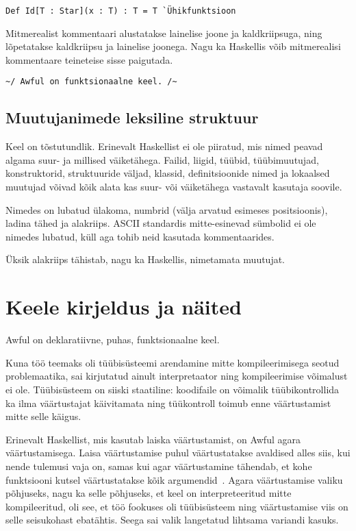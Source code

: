 \documentclass[12pt]{article}
\newcommand\peatykk[1]{
  \clearpage
  \section{#1}}
\begin{document}
      \begin{verbatim}Def Id[T : Star](x : T) : T = T `Ühikfunktsioon\end{verbatim}

      Mitmerealist kommentaari alustatakse lainelise joone ja kaldkriipsuga, ning lõpetatakse kaldkriipsu ja lainelise joonega. Nagu ka Haskellis võib mitmerealisi kommentaare teineteise sisse paigutada.

      \begin{verbatim}~/ Awful on funktsionaalne keel. /~\end{verbatim}
    \subsection{Muutujanimede leksiline struktuur}\label{muutujanimed}
      Keel on tõstutundlik. Erinevalt Haskellist ei ole piiratud, mis nimed peavad algama suur- ja millised väiketähega. Failid, liigid, tüübid, tüübimuutujad, konstruktorid, struktuuride väljad, klassid, definitsioonide nimed ja lokaalsed muutujad võivad kõik alata kas suur- või väiketähega vastavalt kasutaja soovile.

      Nimedes on lubatud ülakoma, numbrid (välja arvatud esimeses positsioonis), ladina tähed ja alakriips. ASCII standardis mitte-esinevad sümbolid ei ole nimedes lubatud, küll aga tohib neid kasutada kommentaarides.

      Üksik alakriips tähistab, nagu ka Haskellis, nimetamata muutujat.
  \peatykk{Keele kirjeldus ja näited}\label{manual}
    Awful on deklaratiivne, puhas, funktsionaalne keel.

    Kuna töö teemaks oli tüübisüsteemi arendamine mitte kompileerimisega seotud problemaatika, sai kirjutatud ainult interpretaator ning kompileerimise võimalust ei ole. Tüübisüsteem on siiski staatiline: koodifaile on võimalik tüübikontrollida ka ilma väärtustajat käivitamata ning tüükontroll toimub enne väärtustamist mitte selle käigus.

    Erinevalt Haskellist, mis kasutab laiska väärtustamist, on Awful agara väärtustamisega. Laisa väärtustamise puhul väärtustatakse avaldised alles siis, kui nende tulemusi vaja on, samas kui agar väärtustamine tähendab, et kohe funktsiooni kutsel väärtustatakse kõik argumendid~\cite{Sem}. Agara väärtustamise valiku põhjuseks, nagu ka selle põhjuseks, et keel on interpreteeritud mitte kompileeritud, oli see, et töö fookuses oli tüübisüsteem ning väärtustamise viis on selle seisukohast ebatähtis. Seega sai valik langetatud lihtsama variandi kasuks.
\end{document}
